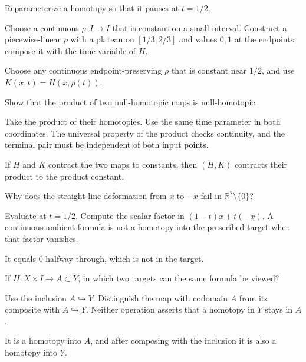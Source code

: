 \begin{exercise}\label{exr:viii01-18}
Reparameterize a homotopy so that it pauses at \(t=1/2\).
\end{exercise}
\begin{hint}Choose a continuous \(\rho:I\to I\) that is constant on a small interval.
Construct a piecewise-linear \(\rho\) with a plateau on \([1/3,2/3]\) and values \(0,1\) at the endpoints; compose it with the time variable of \(H\).
\end{hint}
\begin{solution}
Choose any continuous endpoint-preserving \(\rho\) that is constant near
\(1/2\), and use \(K(x,t)=H(x,\rho(t))\).
\end{solution}

\begin{exercise}\label{exr:viii01-19}
Show that the product of two null-homotopic maps is null-homotopic.
\end{exercise}
\begin{hint}Take the product of their homotopies.
Use the same time parameter in both coordinates. The universal property of the product checks continuity, and the terminal pair must be independent of both input points.
\end{hint}
\begin{solution}
If \(H\) and \(K\) contract the two maps to constants, then
\((H,K)\) contracts their product to the product constant.
\end{solution}

\begin{exercise}\label{exr:viii01-20}
Why does the straight-line deformation from \(x\) to \(-x\) fail in
\(\mathbb R^2\setminus\{0\}\)?
\end{exercise}
\begin{hint}Evaluate at \(t=1/2\).
Compute the scalar factor in \((1-t)x+t(-x)\). A continuous ambient formula is not a homotopy into the prescribed target when that factor vanishes.
\end{hint}
\begin{solution}
It equals \(0\) halfway through, which is not in the target.
\end{solution}

\begin{exercise}\label{exr:viii01-21}
If \(H:X\times I\to A\subset Y\), in which two targets can the same formula be viewed?
\end{exercise}
\begin{hint}Use the inclusion \(A\hookrightarrow Y\).
Distinguish the map with codomain \(A\) from its composite with \(A\hookrightarrow Y\). Neither operation asserts that a homotopy in \(Y\) stays in \(A\).
\end{hint}
\begin{solution}
It is a homotopy into \(A\), and after composing with the inclusion it is also
a homotopy into \(Y\).
\end{solution}

